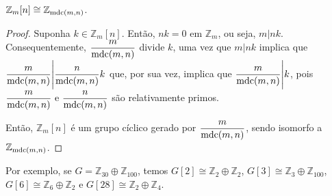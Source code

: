 	\begin{prop}
		\label{regra G[n]}
		$\mathbb{Z}_m[n]\cong \mathbb{Z}_{\operatorname{mdc}(m,n)}$.
	\end{prop}
	\begin{proof}
		Suponha $k\in \mathbb{Z}_m[n]$. Então, $nk = 0$ em $\mathbb{Z}_m$, ou seja, $m|nk$. Consequentemente, $\displaystyle{ \frac{m}{\operatorname{mdc}(m,n)} }$ divide $k$, uma vez que $m|nk$ implica que $\displaystyle{ \frac{m}{\operatorname{mdc}(m,n)} \Bigg| \frac{n}{\operatorname{mdc}(m,n)}k  }$ que, por sua vez, implica que $\displaystyle{ \frac{m}{\operatorname{mdc}(m,n)} }\Bigg| k$, pois $\displaystyle{ \frac{m}{\operatorname{mdc}(m,n)}\text{ e }\frac{n}{\operatorname{mdc}(m,n)}  }$ são relativamente primos.
		\par\vspace{0.3cm} Então, $\mathbb{Z}_m[n]$ é um grupo cíclico gerado por $\displaystyle{\frac{m}{\operatorname{mdc}(m,n)}}$, sendo isomorfo a $\mathbb{Z}_{\operatorname{mdc}(m,n)}$.
	\end{proof}
	\par\vspace{0.3cm} Por exemplo, se $G = \mathbb{Z}_{30}\oplus\mathbb{Z}_{100}$, temos $G[2]\cong \mathbb{Z}_2\oplus\mathbb{Z}_2$, $G[3]\cong \mathbb{Z}_3\oplus\mathbb{Z}_{100}$, $G[6]\cong \mathbb{Z}_6\oplus\mathbb{Z}_2$ e $G[28]\cong \mathbb{Z}_{2}\oplus\mathbb{Z}_4$.
	
